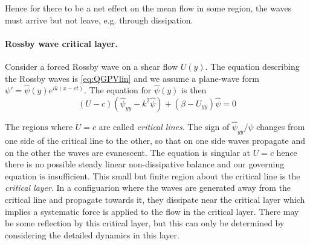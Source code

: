 \documentclass{jknotes}
\begin{document}
Hence for there to be a net effect on the mean flow in some region, the waves
must arrive but not leave, e.g. through dissipation.

\paragraph{Rossby wave critical layer.} Consider a forced Rossby wave on a
shear flow $U(y)$. The equation describing the Rossby waves is
\eqref{eq:QGPVlin} and we assume a plane-wave form $\psi' = \hat{\psi}(y)
e^{ik(x-ct)}$. The equation for $\hat{\psi}(y)$ is then
\begin{equation}
	(U-c)(\hat{\psi}_{yy}-k^2\hat{\psi}) + (\beta-U_{yy})\hat{\psi} = 0
\end{equation}

The regions where $U = c$ are called \emph{critical lines}. The sign of
$\hat{\psi}_{yy}/\hat{\psi}$ changes from one side of the critical line to the
other, so that on one side waves propagate and on the other the waves are
evanescent. The equation is singular at $U = c$ hence there is no possible
steady linear non-dissipative balance and our governing equation is
insufficient. This small but finite region about the critical line is the
\emph{critical layer}. In a configuarion where the waves are generated away
from the critical line and propagate towards it, they dissipate near the
critical layer which implies a systematic force is applied to the flow in the
critical layer. There may be some reflection by this critical layer, but this
can only be determined by considering the detailed dynamics in this layer.
\end{document}
